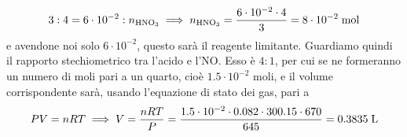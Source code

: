 \begin{soluzione}
\begin{equation*}
        3:4=6 \cdot 10^{-2}:n_{\rm HNO_3}
        \implies
        n_{\rm HNO_3}=\frac{6 \cdot 10^{-2} \cdot 4}{3}
        =8 \cdot 10^{-2} \; \rm mol
    \end{equation*}
    e avendone noi solo $6 \cdot 10^{-2}$, questo sarà il reagente limitante. Guardiamo quindi il rapporto stechiometrico tra l'acido e l'NO. Esso è $4:1$, per cui se ne formeranno un numero di moli pari a un quarto, cioè $1.5 \cdot 10^{-2}$ moli, e il volume corrispondente sarà, usando l'equazione di stato dei gas, pari a
    \begin{equation*}
        PV=nRT
        \implies
        V=\frac{nRT}{P}
        =\frac{1.5 \cdot 10^{-2} \cdot 0.082 \cdot 300.15 \cdot 670}{645}
        =0.3835 \; \rm L
    \end{equation*}
\end{soluzione}

\newpage

